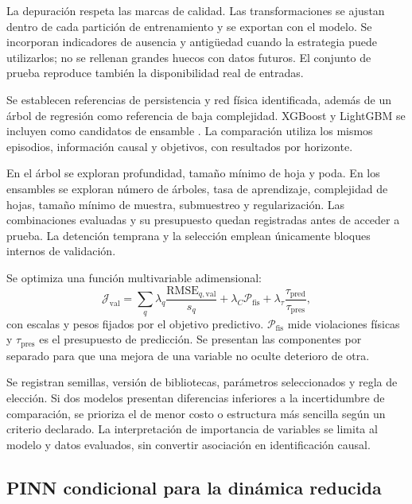 La depuración respeta las marcas de calidad. Las transformaciones se ajustan dentro de cada partición de entrenamiento y se exportan con el modelo. Se incorporan indicadores de ausencia y antigüedad cuando la estrategia puede utilizarlos; no se rellenan grandes huecos con datos futuros. El conjunto de prueba reproduce también la disponibilidad real de entradas.

Se establecen referencias de persistencia y red física identificada, además de un árbol de regresión como referencia de baja complejidad. XGBoost y LightGBM se incluyen como candidatos de ensamble \cite{friedman2001,chen2016,ke2017}. La comparación utiliza los mismos episodios, información causal y objetivos, con resultados por horizonte.

En el árbol se exploran profundidad, tamaño mínimo de hoja y poda. En los ensambles se exploran número de árboles, tasa de aprendizaje, complejidad de hojas, tamaño mínimo de muestra, submuestreo y regularización. Las combinaciones evaluadas y su presupuesto quedan registradas antes de acceder a prueba. La detención temprana y la selección emplean únicamente bloques internos de validación.

Se optimiza una función multivariable adimensional:
\begin{equation}
\mathcal J_{\mathrm{val}}=
\sum_{q}\lambda_q
\frac{\mathrm{RMSE}_{q,\mathrm{val}}}{s_q}
+\lambda_C\mathcal P_{\mathrm{fis}}
+\lambda_\tau\frac{\tau_{\mathrm{pred}}}{\tau_{\mathrm{pres}}},
\label{met:seleccion_ml}
\end{equation}
con escalas y pesos fijados por el objetivo predictivo. $\mathcal P_{\mathrm{fis}}$ mide violaciones físicas y $\tau_{\mathrm{pres}}$ es el presupuesto de predicción. Se presentan las componentes por separado para que una mejora de una variable no oculte deterioro de otra.

Se registran semillas, versión de bibliotecas, parámetros seleccionados y regla de elección. Si dos modelos presentan diferencias inferiores a la incertidumbre de comparación, se prioriza el de menor costo o estructura más sencilla según un criterio declarado. La interpretación de importancia de variables se limita al modelo y datos evaluados, sin convertir asociación en identificación causal.

\subsection{PINN condicional para la dinámica reducida}
\label{met:pinn}

